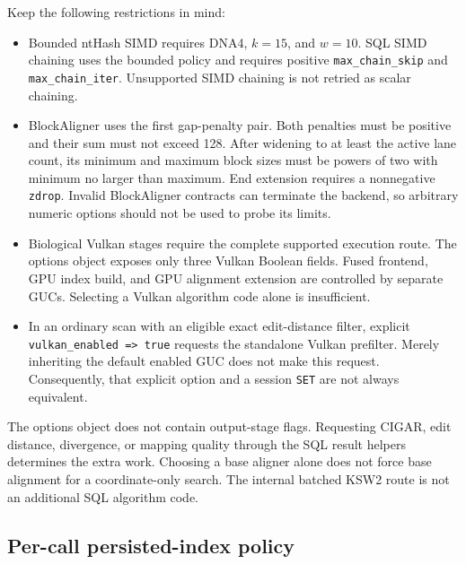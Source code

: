 Keep the following restrictions in mind:
\begin{itemize}
  \item Bounded ntHash SIMD requires DNA4, $k=15$, and $w=10$.
    SQL SIMD chaining uses the bounded policy and requires positive
    \texttt{max\_chain\_skip} and \texttt{max\_chain\_iter}.
    Unsupported SIMD chaining is not retried as scalar chaining.
  \item BlockAligner uses the first gap-penalty pair. Both penalties must
    be positive and their sum must not exceed 128. After widening to at least
    the active lane count, its minimum and maximum block sizes must be
    powers of two with minimum no larger than maximum. End extension
    requires a nonnegative \texttt{zdrop}. Invalid BlockAligner contracts
    can terminate the backend, so arbitrary numeric options should not be
    used to probe its limits.
  \item Biological Vulkan stages require the complete supported execution
    route. The options object exposes only three Vulkan Boolean fields.
    Fused frontend, GPU index build, and GPU alignment extension are
    controlled by separate GUCs. Selecting a Vulkan algorithm code alone
    is insufficient.
  \item In an ordinary scan with an eligible exact edit-distance filter,
    explicit \texttt{vulkan\_enabled => true} requests the standalone
    Vulkan prefilter. Merely inheriting the default enabled GUC does not
    make this request. Consequently, that explicit option and a session
    \texttt{SET} are not always equivalent.
\end{itemize}

The options object does not contain output-stage flags. Requesting CIGAR,
edit distance, divergence, or mapping quality through the SQL result helpers
determines the extra work. Choosing a base aligner alone does not force base
alignment for a coordinate-only search. The internal batched KSW2 route is
not an additional SQL algorithm code.

\subsection{Per-call persisted-index policy}
\label{sec:appendix-options-index-policy}


